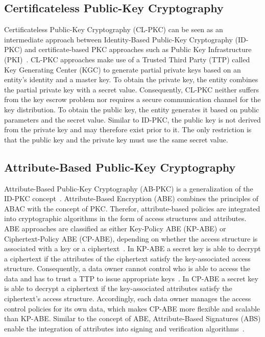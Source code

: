 \subsection{Certificateless Public-Key Cryptography}
Certificateless Public-Key Cryptography (CL-PKC) can be seen as an intermediate approach between Identity-Based Public-Key Cryptography (ID-PKC) and certificate-based PKC approaches such as Public Key Infrastructure (PKI)~\cite{AlRiyami2003}.
CL-PKC approaches make use of a Trusted Third Party (TTP) called Key Generating Center (KGC) to generate partial private keys based on an entity's identity and a master key.
To obtain the private key, the entity combines the partial private key with a secret value.
Consequently, CL-PKC neither suffers from the key escrow problem nor requires a secure communication channel for the key distribution.
To obtain the public key, the entity generates it based on public parameters and the secret value.
Similar to ID-PKC, the public key is not derived from the private key and may therefore exist prior to it.
The only restriction is that the public key and the private key must use the same secret value.

\subsection{Attribute-Based Public-Key Cryptography}
Attribute-Based Public-Key Cryptography (AB-PKC) is a generalization of the ID-PKC concept~\cite{Sahai2005,Goyal2006,Hu2023}.
Attribute-Based Encryption (ABE) combines the principles of ABAC with the concept of PKC.
Therefor, attribute-based policies are integrated into cryptographic algorithms in the form of access structures and attributes.
ABE approaches are classified as either Key-Policy ABE (KP-ABE) or Ciphertext-Policy ABE (CP-ABE), depending on whether the access structure is associated with a key or a ciphertext~\cite{Goyal2006,Bethencourt2007,Hu2023}.
In KP-ABE a secret key is able to decrypt a ciphertext if the attributes of the ciphertext satisfy the key-associated access structure.
Consequently, a data owner cannot control who is able to access the data and has to trust a TTP to issue appropriate keys~\cite{Bethencourt2007}.
In CP-ABE a secret key is able to decrypt a ciphertext if the key-associated attributes satisfy the ciphertext's access structure.
Accordingly, each data owner manages the access control policies for its own data, which makes CP-ABE more flexible and scalable than KP-ABE.
Similar to the concept of ABE, Attribute-Based Signatures (ABS) enable the integration of attributes into signing and verification algorithms~\cite{Li2010,Maji2011}.
